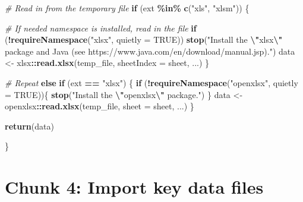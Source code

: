 \documentclass[
]{article}
\newenvironment{Shaded}{\begin{snugshade}}{\end{snugshade}}
\newcommand{\AttributeTok}[1]{\textcolor[rgb]{0.13,0.29,0.53}{#1}}
\newcommand{\CommentTok}[1]{\textcolor[rgb]{0.56,0.35,0.01}{\textit{#1}}}
\newcommand{\ConstantTok}[1]{\textcolor[rgb]{0.56,0.35,0.01}{#1}}
\newcommand{\ControlFlowTok}[1]{\textcolor[rgb]{0.13,0.29,0.53}{\textbf{#1}}}
\newcommand{\FunctionTok}[1]{\textcolor[rgb]{0.13,0.29,0.53}{\textbf{#1}}}
\newcommand{\NormalTok}[1]{#1}
\newcommand{\OtherTok}[1]{\textcolor[rgb]{0.56,0.35,0.01}{#1}}
\newcommand{\SpecialCharTok}[1]{\textcolor[rgb]{0.81,0.36,0.00}{\textbf{#1}}}
\newcommand{\StringTok}[1]{\textcolor[rgb]{0.31,0.60,0.02}{#1}}
\begin{document}
\begin{Shaded}
\begin{Highlighting}[]
  \CommentTok{\# Read in from the temporary file}
  \ControlFlowTok{if}\NormalTok{ (ext }\SpecialCharTok{\%in\%} \FunctionTok{c}\NormalTok{(}\StringTok{"xls"}\NormalTok{, }\StringTok{"xlsm"}\NormalTok{)) \{}
    
    \CommentTok{\# If needed namespace is installed, read in the file}
    \ControlFlowTok{if}\NormalTok{ (}\SpecialCharTok{!}\FunctionTok{requireNamespace}\NormalTok{(}\StringTok{"xlsx"}\NormalTok{, }\AttributeTok{quietly =} \ConstantTok{TRUE}\NormalTok{)) }
      \FunctionTok{stop}\NormalTok{(}\StringTok{"Install the }\SpecialCharTok{\textbackslash{}"}\StringTok{xlsx}\SpecialCharTok{\textbackslash{}"}\StringTok{ package and Java (see https://www.java.com/en/download/manual.jsp)."}\NormalTok{)}
\NormalTok{    data }\OtherTok{\textless{}{-}}\NormalTok{ xlsx}\SpecialCharTok{::}\FunctionTok{read.xlsx}\NormalTok{(temp\_file, }\AttributeTok{sheetIndex =}\NormalTok{ sheet, ...)}
\NormalTok{  \} }
  
  \CommentTok{\# Repeat}
  \ControlFlowTok{else} \ControlFlowTok{if}\NormalTok{ (ext }\SpecialCharTok{==} \StringTok{"xlsx"}\NormalTok{) \{}
    \ControlFlowTok{if}\NormalTok{ (}\SpecialCharTok{!}\FunctionTok{requireNamespace}\NormalTok{(}\StringTok{"openxlsx"}\NormalTok{, }\AttributeTok{quietly =} \ConstantTok{TRUE}\NormalTok{))\{}
      \FunctionTok{stop}\NormalTok{(}\StringTok{"Install the }\SpecialCharTok{\textbackslash{}"}\StringTok{openxlsx}\SpecialCharTok{\textbackslash{}"}\StringTok{ package."}\NormalTok{)}
\NormalTok{    \}}
\NormalTok{    data }\OtherTok{\textless{}{-}}\NormalTok{ openxlsx}\SpecialCharTok{::}\FunctionTok{read.xlsx}\NormalTok{(temp\_file, }\AttributeTok{sheet =}\NormalTok{ sheet, ...)}
\NormalTok{  \} }
  
  \FunctionTok{return}\NormalTok{(data)}
  
\NormalTok{\}}
\end{Highlighting}
\end{Shaded}

\section*{Chunk 4: Import key data files}\label{chunk-4-import-key-data-files}
\end{document}
